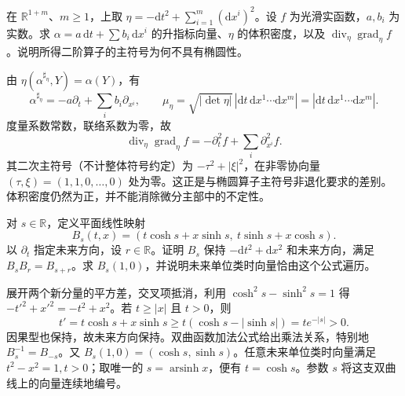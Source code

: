 \BookExercises

\begin{exercise}\label{g3:ex:A-wave-symbol}
	在 \(\mathbb R^{1+m}\)、\(m\ge1\)，上取 \(\eta=-\mathrm dt^2+\sum_{i=1}^m(\mathrm dx^i)^2\)。设 \(f\) 为光滑实函数，\(a,b_i\) 为实数。求 \(\alpha=a\,\mathrm dt+\sum b_i\,\mathrm dx^i\) 的升指标向量、\(\eta\) 的体积密度，以及 \(\operatorname{div}_\eta\operatorname{grad}_\eta f\)。说明所得二阶算子的主符号为何不具有椭圆性。
\end{exercise}
\begin{solution}
	由 \(\eta(\alpha^{\sharp_\eta},Y)=\alpha(Y)\)，有
	\[
		\alpha^{\sharp_\eta}=-a\partial_t+\sum_i b_i\partial_{x^i},
		\qquad
		\mu_\eta=\sqrt{|\det\eta|}\,|\mathrm dt\,\mathrm dx^1\cdots\mathrm dx^m|
		=|\mathrm dt\,\mathrm dx^1\cdots\mathrm dx^m|.
	\]
	度量系数常数，联络系数为零，故
	\[
		\operatorname{div}_\eta\operatorname{grad}_\eta f
		=-\partial_t^2f+\sum_i\partial_{x^i}^2f.
	\]
	其二次主符号（不计整体符号约定）为 \(-\tau^2+|\xi|^2\)，在非零协向量 \((\tau,\xi)=(1,1,0,\ldots,0)\) 处为零。这正是与椭圆算子主符号非退化要求的差别。体积密度仍然为正，并不能消除微分主部中的不定性。
\end{solution}

\begin{exercise}\label{g3:ex:A-boost}
	对 \(s\in\mathbb R\)，定义平面线性映射
	\[
		B_s(t,x)=(t\cosh s+x\sinh s,\ t\sinh s+x\cosh s).
	\]
	以 \(\partial_t\) 指定未来方向，设 \(r\in\mathbb R\)。证明 \(B_s\) 保持 \(-\mathrm dt^2+\mathrm dx^2\) 和未来方向，满足 \(B_sB_r=B_{s+r}\)。求 \(B_s(1,0)\)，并说明未来单位类时向量恰由这个公式遍历。
\end{exercise}
\begin{solution}
	展开两个新分量的平方差，交叉项抵消，利用 \(\cosh^2s-\sinh^2s=1\) 得 \(-t'^2+x'^2=-t^2+x^2\)。若 \(t\ge|x|\) 且 \(t>0\)，则
	\[
		t'=t\cosh s+x\sinh s
		\ge t(\cosh s-|\sinh s|)=te^{-|s|}>0.
	\]
	因果型也保持，故未来方向保持。双曲函数加法公式给出乘法关系，特别地 \(B_s^{-1}=B_{-s}\)。又 \(B_s(1,0)=(\cosh s,\sinh s)\)。任意未来单位类时向量满足 \(t^2-x^2=1,t>0\)；取唯一的 \(s=\operatorname{arsinh}x\)，便有 \(t=\cosh s\)。参数 \(s\) 将这支双曲线上的向量连续地编号。
\end{solution}

